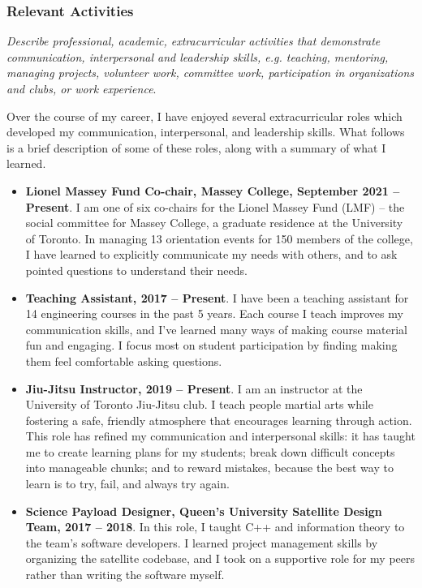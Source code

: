 \documentclass[a4paper,12pt]{article}
\begin{document}
\subsubsection*{Relevant Activities}
\textit{Describe professional, academic, extracurricular activities that
    demonstrate communication, interpersonal and leadership skills, e.g.
    teaching, mentoring, managing projects, volunteer work, committee work,
participation in organizations and clubs, or work experience}.

Over the course of my career, I have enjoyed several extracurricular roles which
developed my communication, interpersonal, and leadership skills.
What follows is a brief description of some of these roles, along with a summary
of what I learned.
\begin{itemize}
\item \textbf{Lionel Massey Fund Co-chair, Massey College, September 2021 -- Present}.
    I am one of six co-chairs for the Lionel Massey Fund (LMF) -- the social
    committee for Massey College, a graduate residence at the University of
    Toronto.
    In managing 13 orientation events for 150 members of the college, I have
    learned to explicitly communicate my needs with others, and to ask pointed
    questions to understand their needs.

\item \textbf{Teaching Assistant, 2017 -- Present}.
    I have been a teaching assistant for 14 engineering courses in the past 5 years.
    Each course I teach improves my communication skills, and I've learned
    many ways of making course material fun and engaging.
    I focus most on student participation by finding making them feel
    comfortable asking questions. 

\item \textbf{Jiu-Jitsu Instructor, 2019 -- Present}. 
    I am an instructor at the University of Toronto Jiu-Jitsu club. I teach
    people martial arts while fostering a safe, friendly atmosphere that
    encourages learning through action.
    This role has refined my communication and interpersonal skills:
    it has taught me to create learning plans for my students;
    break down difficult concepts into manageable chunks; 
    and to reward mistakes, because the best way to learn is to try, fail, and
    always try again.

\item \textbf{Science Payload Designer, Queen’s University Satellite Design
    Team, 2017 -- 2018}. 
    In this role, I taught C++ and information theory to the team’s software
    developers. I learned project management skills by organizing
    the satellite codebase, and I took on a supportive role for my peers rather
    than writing the software myself.


\end{itemize}
\end{document}
